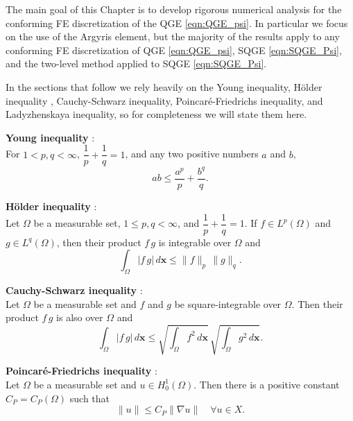The main goal of this Chapter is to develop rigorous numerical analysis for the
conforming FE discretization of the QGE \eqref{eqn:QGE_psi}. In particular we
focus on the use of the Argyris element, but the majority of the results apply
to any conforming FE discretization of QGE \eqref{eqn:QGE_psi}, SQGE
\eqref{eqn:SQGE_Psi}, and the two-level method applied to SQGE
\eqref{eqn:SQGE_Psi}.

In the sections that follow we rely heavily on the Young inequality, H\"older
inequality , Cauchy-Schwarz inequality, Poincar\'e-Friedrichs inequality, and
Ladyzhenskaya inequality, so for completeness we will state them here.

\begin{definition} \label{def:Young}
  \textbf{Young inequality} \cite{Royden2010}:\\
  For $1 < p,q < \infty$, $\dfrac{1}{p} + \dfrac{1}{q} = 1$, and any two
  positive numbers $a$ and $b$,
  \begin{equation}
    ab \le \frac{a^p}{p} + \frac{b^q}{q}.
    \label{eqn:Young}
  \end{equation}
\end{definition}
\begin{definition} \label{def:Holder}
  \textbf{H\"older inequality} \cite{Royden2010}:\\
  Let $\Omega$ be a measurable set, $1\le p,q < \infty$, and $\dfrac{1}{p} +
  \dfrac{1}{q} = 1$. If $f \in L^p(\Omega)$ and $g \in L^q(\Omega)$, then their
  product $f\, g$ is integrable over $\Omega$ and
  \begin{equation}
    \int_{\Omega}\! |f\, g| \, d\mathbf{x} \le \|f\|_p\, \|g\|_q.
    \label{eqn:Holder}
  \end{equation}
\end{definition}
\begin{definition} \label{def:Cauchy-Schwarz}
  \textbf{Cauchy-Schwarz inequality} \cite{Royden2010}:\\
  Let $\Omega$ be a measurable set and $f$ and $g$ be square-integrable over
  $\Omega$. Then their product $f\, g$ is also over $\Omega$ and
  \begin{equation}
    \int_{\Omega}\! |f\,g|\, d\mathbf{x} \le \sqrt{\int_{\Omega}\! f^2 \,
      d\mathbf{x}}\, \sqrt{\int_{\Omega}\! g^2 \, d\mathbf{x}}.
    \label{eqn:Cauchy}
  \end{equation}

\end{definition}
\begin{definition} \label{def:Poincare}
  \textbf{Poincar\'e-Friedrichs inequality} \cite{Layton08}:\\
  Let $\Omega$ be a measurable set and $u \in H^1_0(\Omega)$. Then there is a
  positive constant $C_P = C_P(\Omega)$ such that
  \begin{equation}
    \|u\| \le C_P \|\nabla u\| \quad \forall u \in X.
    \label{eqn:Poincare}
  \end{equation}
\end{definition}

